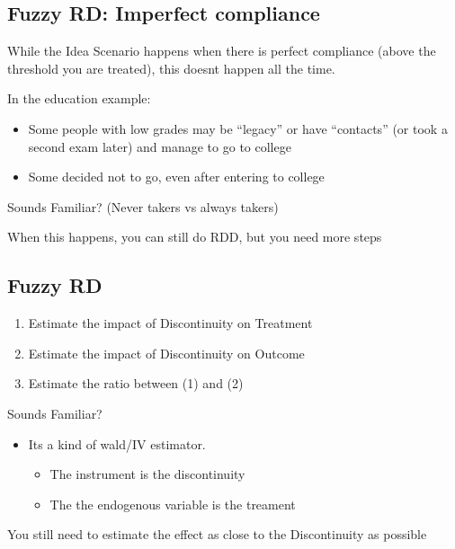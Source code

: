 \documentclass[
  letterpaper,
  DIV=11,
  numbers=noendperiod]{scrartcl}
\providecommand{\tightlist}{%
  \setlength{\itemsep}{0pt}\setlength{\parskip}{0pt}}\usepackage{longtable,booktabs,array}
\begin{document}
\subsection{Fuzzy RD: Imperfect
compliance}\label{fuzzy-rd-imperfect-compliance}

While the Idea Scenario happens when there is perfect compliance (above
the threshold you are treated), this doesnt happen all the time.

In the education example:

\begin{itemize}
\tightlist
\item
  Some people with low grades may be ``legacy'' or have ``contacts'' (or
  took a second exam later) and manage to go to college
\item
  Some decided not to go, even after entering to college
\end{itemize}

Sounds Familiar? (Never takers vs always takers)

When this happens, you can still do RDD, but you need more steps

\subsection{Fuzzy RD}\label{fuzzy-rd}

\begin{enumerate}
\def\labelenumi{\arabic{enumi}.}
\tightlist
\item
  Estimate the impact of Discontinuity on Treatment
\item
  Estimate the impact of Discontinuity on Outcome
\item
  Estimate the ratio between (1) and (2)
\end{enumerate}

Sounds Familiar?

\begin{itemize}
\tightlist
\item
  Its a kind of wald/IV estimator.

  \begin{itemize}
  \tightlist
  \item
    The instrument is the discontinuity
  \item
    The the endogenous variable is the treament
  \end{itemize}
\end{itemize}

You still need to estimate the effect as close to the Discontinuity as
possible
\end{document}
